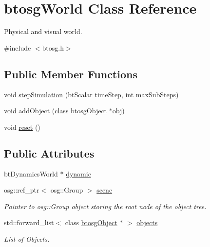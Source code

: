 \hypertarget{classbtosgWorld}{}\section{btosg\+World Class Reference}
\label{classbtosgWorld}


Physical and visual world.  




{\ttfamily \#include $<$btosg.\+h$>$}

\subsection*{Public Member Functions}
\begin{DoxyCompactItemize}
\item 
void \hyperlink{classbtosgWorld_afce096686d8f84afd8b8fa3f2dc161b8}{step\+Simulation} (bt\+Scalar time\+Step, int max\+Sub\+Steps)
\item 
void \hyperlink{classbtosgWorld_ae5b71c6319dd420479096a265a1725b7}{add\+Object} (class \hyperlink{classbtosgObject}{btosg\+Object} $\ast$obj)
\item 
void \hyperlink{classbtosgWorld_a6af4d066410a86b44fff5563667ea9a9}{reset} ()
\end{DoxyCompactItemize}
\subsection*{Public Attributes}
\begin{DoxyCompactItemize}
\item 
bt\+Dynamics\+World $\ast$ \hyperlink{classbtosgWorld_ad757a7b3b845142f200d1f2127e5372e}{dynamic}
\item 
osg\+::ref\+\_\+ptr$<$ osg\+::\+Group $>$ \hyperlink{classbtosgWorld_ab6d438f54ccfc18955ea43e87731e008}{scene}
\begin{DoxyCompactList}\small\item\em Pointer to osg\+::\+Group object storing the root node of the object tree. \end{DoxyCompactList}\item 
std\+::forward\+\_\+list$<$ class \hyperlink{classbtosgObject}{btosg\+Object} $\ast$ $>$ \hyperlink{classbtosgWorld_ab105aa8c0f8bdbdf323d47b902f6aca0}{objects}
\begin{DoxyCompactList}\small\item\em List of Objects. \end{DoxyCompactList}\end{DoxyCompactItemize}


